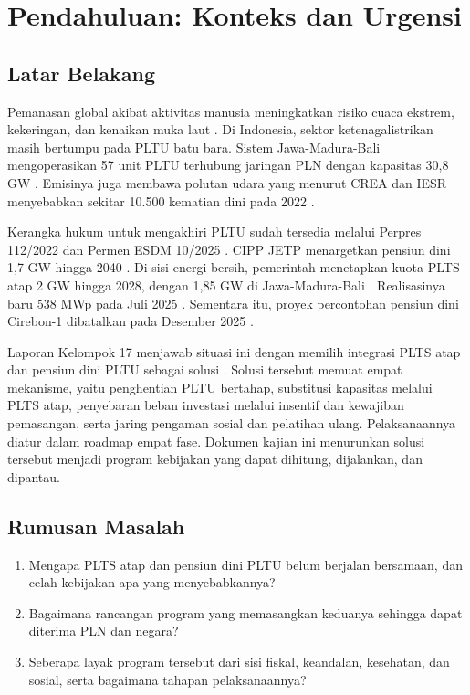 \section{Pendahuluan: Konteks dan Urgensi}
\label{sec:pendahuluan}

\subsection{Latar Belakang}

Pemanasan global akibat aktivitas manusia meningkatkan risiko cuaca ekstrem, kekeringan, dan kenaikan muka laut \cite{P-IPCC-2023}. Di Indonesia, sektor ketenagalistrikan masih bertumpu pada PLTU batu bara. Sistem Jawa-Madura-Bali mengoperasikan 57 unit PLTU terhubung jaringan PLN dengan kapasitas 30,8 GW \cite{D-GEM-GCPT}. Emisinya juga membawa polutan udara yang menurut CREA dan IESR menyebabkan sekitar 10.500 kematian dini pada 2022 \cite{P-CREA-IESR-2023}.

Kerangka hukum untuk mengakhiri PLTU sudah tersedia melalui Perpres 112/2022 dan Permen ESDM 10/2025 \cite{R-PERPRES-112-2022,R-PERMEN-ESDM-10-2025}. CIPP JETP menargetkan pensiun dini 1,7 GW hingga 2040 \cite{P-JETP-CIPP-2023,P-CREA-CIPP-2023}. Di sisi energi bersih, pemerintah menetapkan kuota PLTS atap 2 GW hingga 2028, dengan 1,85 GW di Jawa-Madura-Bali \cite{B-CNBC-ROOFTOP-2028}. Realisasinya baru 538 MWp pada Juli 2025 \cite{B-KONTAN-ROOFTOP-2025}. Sementara itu, proyek percontohan pensiun dini Cirebon-1 dibatalkan pada Desember 2025 \cite{B-BISNIS-CIREBON-BATAL-2025,B-PETROMINDO-CIREBON-BATAL}.

Laporan Kelompok 17 menjawab situasi ini dengan memilih integrasi PLTS atap dan pensiun dini PLTU sebagai solusi \cite{L-LAPORAN-K17}. Solusi tersebut memuat empat mekanisme, yaitu penghentian PLTU bertahap, substitusi kapasitas melalui PLTS atap, penyebaran beban investasi melalui insentif dan kewajiban pemasangan, serta jaring pengaman sosial dan pelatihan ulang. Pelaksanaannya diatur dalam roadmap empat fase. Dokumen kajian ini menurunkan solusi tersebut menjadi program kebijakan yang dapat dihitung, dijalankan, dan dipantau.

\subsection{Rumusan Masalah}

\begin{enumerate}
  \item Mengapa PLTS atap dan pensiun dini PLTU belum berjalan bersamaan, dan celah kebijakan apa yang menyebabkannya?
  \item Bagaimana rancangan program yang memasangkan keduanya sehingga dapat diterima PLN dan negara?
  \item Seberapa layak program tersebut dari sisi fiskal, keandalan, kesehatan, dan sosial, serta bagaimana tahapan pelaksanaannya?
\end{enumerate}

